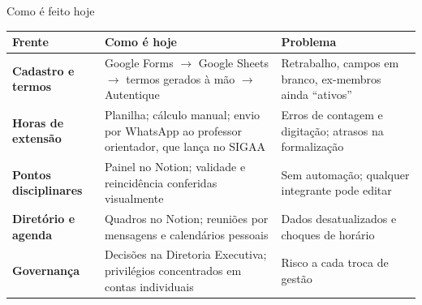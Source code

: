 \documentclass[aspectratio=169,9pt]{beamer}
\begin{document}
\begin{frame}{Como é feito hoje}
  \small
  \renewcommand{\arraystretch}{1.25}
  \begin{tabular}{@{}>{\bfseries}P{2.6cm}P{5.8cm}P{4.2cm}@{}}
    \toprule
    Frente & Como é hoje & Problema \\
    \midrule
    Cadastro e termos & Google Forms $\rightarrow$ Google Sheets $\rightarrow$ termos gerados à mão $\rightarrow$ Autentique & Retrabalho, campos em branco, ex-membros ainda ``ativos'' \\
    Horas de extensão & Planilha; cálculo manual; envio por WhatsApp ao professor orientador, que lança no SIGAA & Erros de contagem e digitação; atrasos na formalização \\
    Pontos disciplinares & Painel no Notion; validade e reincidência conferidas visualmente & Sem automação; qualquer integrante pode editar \\
    Diretório e agenda & Quadros no Notion; reuniões por mensagens e calendários pessoais & Dados desatualizados e choques de horário \\
    Governança & Decisões na Diretoria Executiva; privilégios concentrados em contas individuais & Risco a cada troca de gestão \\
    \bottomrule
  \end{tabular}
\end{frame}
\end{document}
